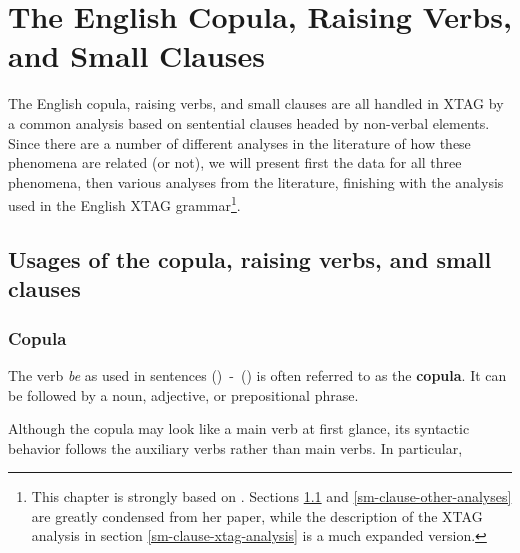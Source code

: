 \section{The English Copula, Raising Verbs, and Small Clauses}
\label{small-clauses}

The English copula, raising verbs, and small clauses are all handled in XTAG by
a common analysis based on sentential clauses headed by non-verbal elements.
Since there are a number of different analyses in the literature of how these
phenomena are related (or not), we will present first the data for all three
phenomena, then various analyses from the literature, finishing with the
analysis used in the English XTAG grammar\footnote{This chapter is strongly
based on \cite{heycock91}.  Sections \ref{sm-clause-data} and
\ref{sm-clause-other-analyses} are greatly condensed from her paper, while the 
description of the XTAG analysis in section \ref{sm-clause-xtag-analysis} is a
much expanded version.}.


\subsection{Usages of the copula, raising verbs, and small clauses}
\label{sm-clause-data}

\subsubsection{Copula}
\label{copula-data}

The verb {\it be} as used in sentences ({})~-~({}) is often
referred to as the {\bf copula}.  It can be followed by a noun, adjective, or
prepositional phrase.


Although the copula may look like a main verb at first glance, its syntactic
behavior follows the auxiliary verbs rather than main verbs.  In particular,

